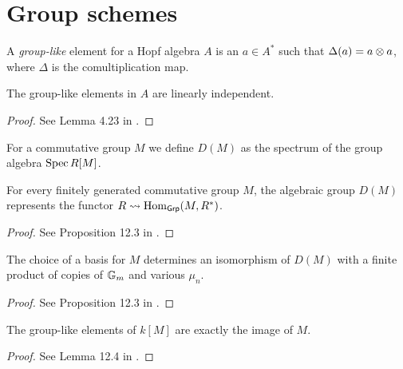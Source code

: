 \section{Group schemes}

\begin{definition}
  \label{grp_like}
  A \emph{group-like} element for a Hopf algebra $A$ is
  an $a\in A^*$ such that $\Delta(a) = a \otimes a$, where $\Delta$ is the comultiplication map.
\end{definition}

\begin{lemma}
  \label{grp_like_li}
  The group-like elements in $A$ are linearly independent.
\end{lemma}
\begin{proof}
  See Lemma 4.23 in \cite{Milne_2017}.
\end{proof}

\begin{definition}
  \label{grp_alg_sch}
  For a commutative group $M$ we define $D(M)$ as the spectrum of the group algebra $\operatorname{Spec} R[M]$.
\end{definition}

\begin{proposition}
  \label{DM_func}
  For every finitely generated commutative group $M$, the algebraic group $D(M)$
  represents the functor $R \rightsquigarrow \operatorname{Hom}_{\mathsf{Grp}}(M,R^*)$.
\end{proposition}
\begin{proof}
  See Proposition 12.3 in \cite{Milne_2017}.
\end{proof}

\begin{proposition}
  \label{DM_struct}
  The choice of a basis for $M$ determines an isomorphism of $D(M)$
  with a finite product of copies of ${\mathbb G_m}$ and various $\mu_n$.
\end{proposition}
\begin{proof}
  See Proposition 12.3 in \cite{Milne_2017}.
\end{proof}

\begin{lemma}
  \label{grp_like_in_kM}
  The group-like elements of $k[M]$ are exactly the image of $M$.
\end{lemma}
\begin{proof}
  See Lemma 12.4 in \cite{Milne}.
\end{proof}

